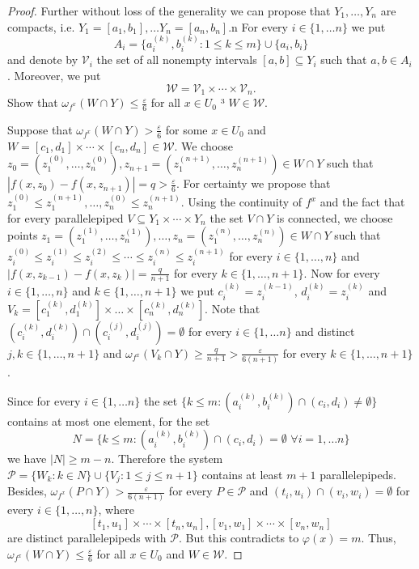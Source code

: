 \documentclass{amsart}
\begin{document}
\begin{proof}
Further without loss of the generality we can propose that $Y_1,\dots, Y_n$ are compacts, i.e. $Y_1=[a_1,b_1],\dots Y_n=[a_n,b_n]$.n For every $i\in\{1,\dots n\}$ we put $$A_i=\{a_i^{(k)}, b_i^{(k)}:1\leq k\leq m\}\cup\{a_i,b_i\}$$ and denote by ${\mathcal V}_i$ the set of all nonempty intervals $[a,b]\subseteq Y_i$ such that $a,b\in A_i$. Moreover, we put $${\mathcal W}={\mathcal V}_1\times\cdots\times {\mathcal V}_n.$$ Show that $\omega_{f^x}(W\cap Y)\leq\frac{\varepsilon}{6}$ for all $x\in U_0$ ³ $W\in {\mathcal W}$.

Suppose that $\omega_{f^x}(W\cap Y)>\frac{\varepsilon}{6}$ for some $x\in U_0$ and $W=[c_1,d_1]\times\cdots\times [c_n,d_n]\in {\mathcal W}$. We choose $z_0=(z_1^{(0)}, \dots,z_n^{(0)}), z_{n+1}=(z_1^{(n+1)}, \dots,z_n^{(n+1)})\in W\cap Y$ such that $|f(x,z_0)-f(x,z_{n+1})|=q>\frac{\varepsilon}{6}$. For certainty we propose that $z_1^{(0)}\leq z_1^{(n+1)},\dots , z_n^{(0)}\leq z_n^{(n+1)}$. Using the continuity of $f^x$ and the fact that for every parallelepiped $V\subseteq Y_1\times\cdots \times Y_n$ the set $V\cap Y$ is connected, we choose points $z_1=(z_1^{(1)}, \dots,z_n^{(1)}),\dots , z_{n}=(z_1^{(n)}, \dots,z_n^{(n)})\in W\cap Y$ such that $z_i^{(0)}\leq z_i^{(1)}\leq z_i^{(2)}\leq\cdots\leq z_i^{(n)}\leq z_i^{(n+1)}$ for every $i\in \{1,\dots, n\}$ and  $|f(x,z_{k-1})-f(x,z_{k})|=\frac{q}{n+1}$ for every $k\in \{1,\dots, n+1\}$. Now for every $i\in \{1,\dots, n\}$ and $k\in \{1,\dots, n+1\}$ we put $c_i^{(k)}=z_i^{(k-1)}$,  $d_i^{(k)}=z_i^{(k)}$ and $V_k=[c_1^{(k)},d_1^{(k)}]\times\dots\times [c_n^{(k)},d_n^{(k)}]$. Note that $(c_i^{(k)},d_i^{(k)})\cap(c_i^{(j)},d_i^{(j)})=\emptyset$ for every $i\in\{1,\dots n\}$ and distinct $j,k\in \{1,\dots, n+1\}$ and $\omega_{f^x}(V_{k}\cap Y)\geq \frac{q}{n+1} > \frac{\varepsilon}{6(n+1)}$ for every $k\in \{1,\dots, n+1\}$.

Since for every $i\in\{1,\dots n\}$ the set $\{k\leq m: (a_i^{(k)},b_i^{(k)})\cap (c_i,d_i)\ne\emptyset\}$ contains at most one element, for the set $$N=\{k\leq m: (a_i^{(k)},b_i^{(k)})\cap (c_i,d_i)=\emptyset\,\,\forall i=1,\dots n\}$$ we have $|N|\geq m-n$. Therefore the system ${\mathcal P}=\{W_k:k\in N\}\cup\{V_j:1\leq j\leq n+1\}$ contains at least $m+1$ parallelepipeds. Besides, $\omega_{f^x}(P\cap Y) > \frac{\varepsilon}{6(n+1)}$ for every $P\in{\mathcal P}$ and $(t_i,u_i)\cap (v_i,w_i)=\emptyset$ for every $i\in \{1,\dots, n\}$, where $$[t_1,u_1]\times\cdots\times [t_n,u_n], [v_1,w_1]\times\cdots\times [v_n,w_n]$$ are distinct parallelepipeds with ${\mathcal P}$. But this contradicts to $\varphi(x)=m$. Thus, $\omega_{f^x}(W\cap Y)\leq\frac{\varepsilon}{6}$ for all $x\in U_0$ and $W\in {\mathcal W}$.


\end{proof}
\end{document}

